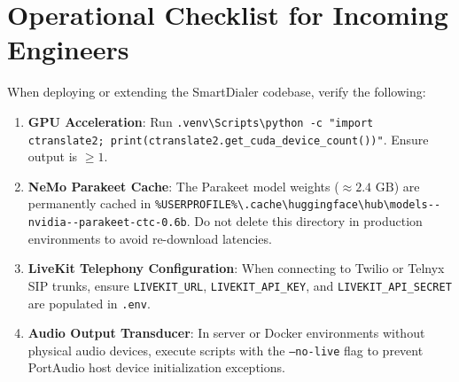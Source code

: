 \documentclass[11pt,a4paper,titlepage]{report}
\begin{document}
\section{Operational Checklist for Incoming Engineers}
When deploying or extending the SmartDialer codebase, verify the following:
\begin{enumerate}[label=\textbf{\arabic*.}]
    \item \textbf{GPU Acceleration}: Run \verb|.venv\Scripts\python -c "import ctranslate2; print(ctranslate2.get_cuda_device_count())"|. Ensure output is $\ge 1$.
    \item \textbf{NeMo Parakeet Cache}: The Parakeet model weights ($\approx 2.4\text{ GB}$) are permanently cached in \verb|%USERPROFILE%\.cache\huggingface\hub\models--nvidia--parakeet-ctc-0.6b|. Do not delete this directory in production environments to avoid re-download latencies.
    \item \textbf{LiveKit Telephony Configuration}: When connecting to Twilio or Telnyx SIP trunks, ensure \texttt{LIVEKIT\_URL}, \texttt{LIVEKIT\_API\_KEY}, and \texttt{LIVEKIT\_API\_SECRET} are populated in \texttt{.env}.
    \item \textbf{Audio Output Transducer}: In server or Docker environments without physical audio devices, execute scripts with the \texttt{--no-live} flag to prevent PortAudio host device initialization exceptions.
\end{enumerate}
\end{document}
